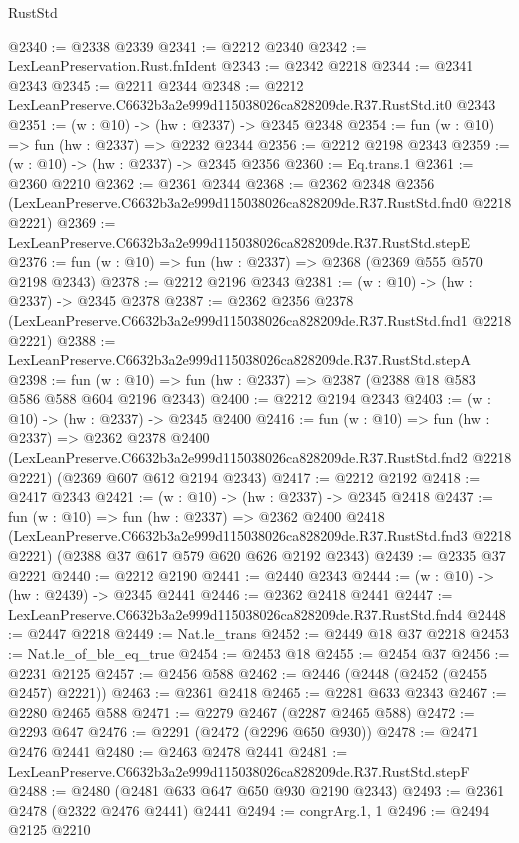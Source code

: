 \begin{lexlean}{RustStd}
\begin{coremodule}
@2340 := @2338 @2339
@2341 := @2212 @2340
@2342 := LexLeanPreservation.Rust.fnIdent
@2343 := @2342 @2218
@2344 := @2341 @2343
@2345 := @2211 @2344
@2348 := @2212 LexLeanPreserve.C6632b3a2e999d115038026ca828209de.R37.RustStd.it0 @2343
@2351 := (w : @10) -> (hw : @2337) -> @2345 @2348
@2354 := fun (w : @10) => fun (hw : @2337) => @2232 @2344
@2356 := @2212 @2198 @2343
@2359 := (w : @10) -> (hw : @2337) -> @2345 @2356
@2360 := Eq.trans.{1}
@2361 := @2360 @2210
@2362 := @2361 @2344
@2368 := @2362
    @2348
    @2356
    (LexLeanPreserve.C6632b3a2e999d115038026ca828209de.R37.RustStd.fnd0 @2218 @2221)
@2369 := LexLeanPreserve.C6632b3a2e999d115038026ca828209de.R37.RustStd.stepE
@2376 := fun (w : @10) => fun (hw : @2337) => @2368 (@2369 @555 @570 @2198 @2343)
@2378 := @2212 @2196 @2343
@2381 := (w : @10) -> (hw : @2337) -> @2345 @2378
@2387 := @2362
    @2356
    @2378
    (LexLeanPreserve.C6632b3a2e999d115038026ca828209de.R37.RustStd.fnd1 @2218 @2221)
@2388 := LexLeanPreserve.C6632b3a2e999d115038026ca828209de.R37.RustStd.stepA
@2398 := fun (w : @10) => fun (hw : @2337) => @2387 (@2388 @18 @583 @586 @588 @604 @2196 @2343)
@2400 := @2212 @2194 @2343
@2403 := (w : @10) -> (hw : @2337) -> @2345 @2400
@2416 := fun (w : @10) =>
  fun (hw : @2337) =>
  @2362
    @2378
    @2400
    (LexLeanPreserve.C6632b3a2e999d115038026ca828209de.R37.RustStd.fnd2 @2218 @2221)
    (@2369 @607 @612 @2194 @2343)
@2417 := @2212 @2192
@2418 := @2417 @2343
@2421 := (w : @10) -> (hw : @2337) -> @2345 @2418
@2437 := fun (w : @10) =>
  fun (hw : @2337) =>
  @2362
    @2400
    @2418
    (LexLeanPreserve.C6632b3a2e999d115038026ca828209de.R37.RustStd.fnd3 @2218 @2221)
    (@2388 @37 @617 @579 @620 @626 @2192 @2343)
@2439 := @2335 @37 @2221
@2440 := @2212 @2190
@2441 := @2440 @2343
@2444 := (w : @10) -> (hw : @2439) -> @2345 @2441
@2446 := @2362 @2418 @2441
@2447 := LexLeanPreserve.C6632b3a2e999d115038026ca828209de.R37.RustStd.fnd4
@2448 := @2447 @2218
@2449 := Nat.le_trans
@2452 := @2449 @18 @37 @2218
@2453 := Nat.le_of_ble_eq_true
@2454 := @2453 @18
@2455 := @2454 @37
@2456 := @2231 @2125
@2457 := @2456 @588
@2462 := @2446 (@2448 (@2452 (@2455 @2457) @2221))
@2463 := @2361 @2418
@2465 := @2281 @633 @2343
@2467 := @2280 @2465 @588
@2471 := @2279 @2467 (@2287 @2465 @588)
@2472 := @2293 @647
@2476 := @2291 (@2472 (@2296 @650 @930))
@2478 := @2471 @2476 @2441
@2480 := @2463 @2478 @2441
@2481 := LexLeanPreserve.C6632b3a2e999d115038026ca828209de.R37.RustStd.stepF
@2488 := @2480 (@2481 @633 @647 @650 @930 @2190 @2343)
@2493 := @2361 @2478 (@2322 @2476 @2441) @2441
@2494 := congrArg.{1, 1}
@2496 := @2494 @2125 @2210

\end{coremodule}
\end{lexlean}
